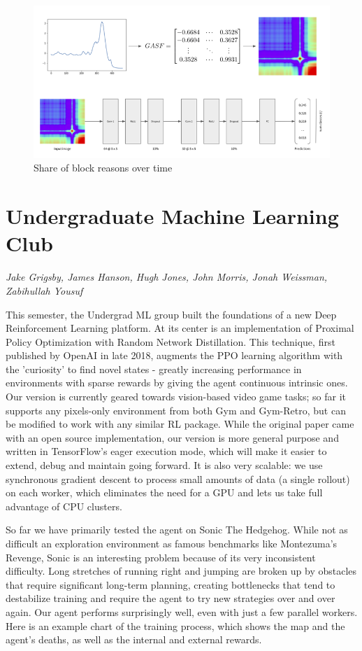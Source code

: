 \begin{figure}[!hbtp]
\includegraphics[width=\textwidth]{images/hm}
\caption{Share of block reasons over time}
\end{figure}

\section{Undergraduate Machine Learning Club}
\label{sec:mlc}

\emph{Jake Grigsby, James Hanson, Hugh Jones, John Morris, Jonah Weissman, Zabihullah Yousuf}
\bigskip


This semester, the Undergrad ML group built the foundations of a new Deep Reinforcement Learning platform. At its center is an implementation of Proximal Policy Optimization with Random Network Distillation. This technique, first published by OpenAI in late 2018, augments the PPO learning algorithm with the 'curiosity' to find novel states - greatly increasing performance in environments with sparse rewards by giving the agent continuous intrinsic ones. Our version is currently geared towards vision-based video game tasks; so far it supports any pixels-only environment from both Gym and Gym-Retro, but can be modified to work with any similar RL package. While the original paper came with an open source implementation, our version is more general purpose and written in TensorFlow's eager execution mode, which will make it easier to extend, debug and maintain going forward. It is also very scalable: we use synchronous gradient descent to process small amounts of data (a single rollout) on each worker, which eliminates the need for a GPU and lets us take full advantage of CPU clusters.

So far we have primarily tested the agent on Sonic The Hedgehog. While not as difficult an exploration environment as famous benchmarks like Montezuma's Revenge, Sonic is an interesting problem because of its very inconsistent difficulty. Long stretches of running right and jumping are broken up by obstacles that require significant long-term planning, creating bottlenecks that tend to destabilize training and require the agent to try new strategies over and over again. Our agent performs surprisingly well, even with just a few parallel workers. Here is an example chart of the training process, which shows the map and the agent's deaths, as well as the internal and external rewards.

